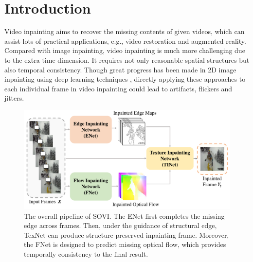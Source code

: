 

\section{Introduction}


Video inpainting aims to recover the missing contents of given videos, which can assist lots of practical applications, e.g., video restoration and augmented reality. Compared with image inpainting, video inpainting is much more challenging due to the extra time dimension. It requires not only reasonable spatial structures but also temporal consistency. 
Though great progress has been made in 2D image inpainting using deep learning techniques \cite{yu2018free,Xiong_2019_CVPR}, directly applying these approaches to each individual frame in video inpainting could lead to artifacts, flickers and jitters. 

\begin{figure}[t]
	\centering
	\includegraphics[width=1.0\columnwidth]{zong} %
	\caption{The overall pipeline of SOVI. The ENet first completes the missing edge across frames. Then, under the guidance of structural edge, TexNet can produce structure-preserved inpainting frame. Moreover, the FNet is designed to predict missing optical flow, which provides temporally consistency to the final result.}
	\label{zong}
\end{figure}



